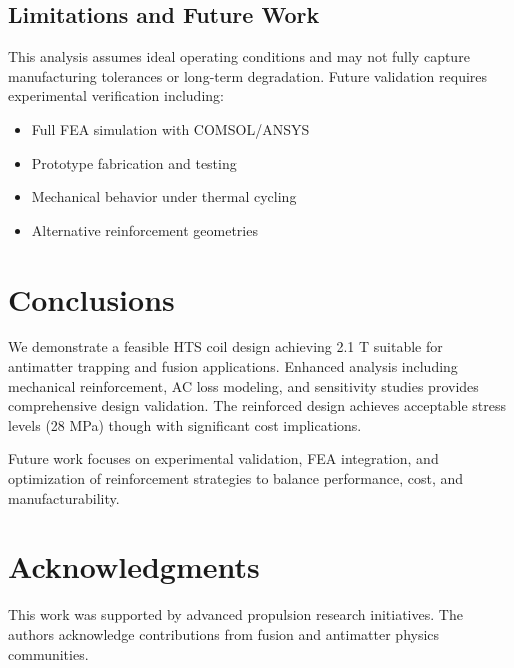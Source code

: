 \documentclass[10pt,twocolumn]{article}
\begin{document}
\subsection{Limitations and Future Work}

This analysis assumes ideal operating conditions and may not fully capture manufacturing tolerances or long-term degradation. Future validation requires experimental verification including:
\begin{itemize}
\item Full FEA simulation with COMSOL/ANSYS
\item Prototype fabrication and testing
\item Mechanical behavior under thermal cycling
\item Alternative reinforcement geometries
\end{itemize}

\section{Conclusions}

We demonstrate a feasible HTS coil design achieving 2.1 T suitable for antimatter trapping and fusion applications. Enhanced analysis including mechanical reinforcement, AC loss modeling, and sensitivity studies provides comprehensive design validation. The reinforced design achieves acceptable stress levels (28 MPa) though with significant cost implications.

Future work focuses on experimental validation, FEA integration, and optimization of reinforcement strategies to balance performance, cost, and manufacturability.

\section{Acknowledgments}

This work was supported by advanced propulsion research initiatives. The authors acknowledge contributions from fusion and antimatter physics communities.
\end{document}

